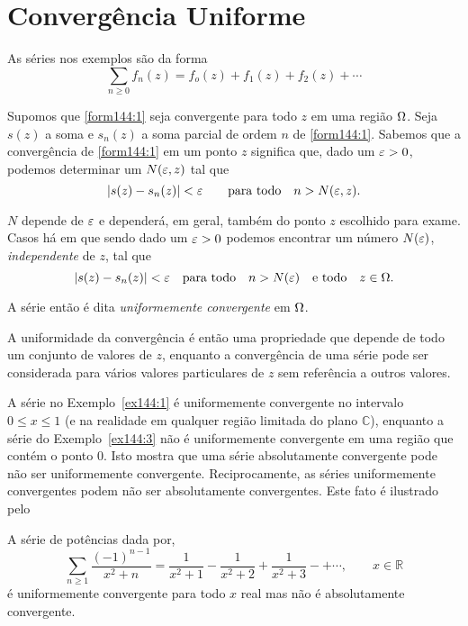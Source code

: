 \section*{Converg\^{e}ncia Uniforme} 
As s\'{e}ries nos exemplos s\~{a}o da
forma
\begin{equation}\label{form144:1}
\sum_{n\geq 0}f_n(z) = f_o(z) + f_1(z) + f_2(z)+\cdots
\end{equation}

Supomos que \eqref{form144:1} seja convergente para todo $z$ em
uma regi\~{a}o $\Omega$. Seja $s(z)$ a soma e $s_n(z)$ a soma parcial de
ordem $n$ de \eqref{form144:1}. Sabemos que a converg\^{e}ncia de
\eqref{form144:1} em um ponto $z$ significa que, dado um $\varepsilon >
0$, podemos determinar um $N(\varepsilon, z)$ tal que
\begin{equation*}
|s(z)-s_n(z)| < \varepsilon\qquad\text{para todo}\quad n > N(\varepsilon, z).
\end{equation*}

$N$ depende de $\varepsilon$ e depender\'{a}, em geral, tamb\'{e}m do ponto $z$
escolhido para exame. Casos h\'{a} em que sendo dado um $\varepsilon > 0$
podemos encontrar um n\'{u}mero $N(\varepsilon)$, \textit{independente} de
$z$, tal que
\begin{equation*}
| s(z) - s_n(z)| < \varepsilon\quad \text{para todo}\quad n >N(\varepsilon)\quad
\text{e todo}\quad z \in \Omega.
\end{equation*}

A s\'{e}rie ent\~{a}o \'{e} dita \textit{uniformemente convergente} em $\Omega$.

A uniformidade da converg\^{e}ncia \'{e} ent\~{a}o uma propriedade que depende
de todo um conjunto de valores de $z$, enquanto a converg\^{e}ncia de
uma s\'{e}rie pode ser considerada para v\'{a}rios valores particulares de
$z$ sem refer\^{e}ncia a outros valores.

A s\'{e}rie no Exemplo~\ref{ex144:1} \'{e} uniformemente convergente no
intervalo $0\le  x\le 1$ (e na realidade em qualquer regi\~{a}o
limitada do plano $\mathbb{C}$), enquanto a s\'{e}rie do
Exemplo~\ref{ex144:3} n\~{a}o \'{e} uniformemente convergente em uma
regi\~{a}o que cont\'{e}m o ponto $0$. Isto mostra que uma s\'{e}rie
absolutamente convergente pode n\~{a}o ser uniformemente convergente.
Reciprocamente, as s\'{e}ries uniformemente convergentes podem n\~{a}o ser
absolutamente convergentes. Este fato \'{e} ilustrado pelo

\begin{exer}\label{ex144:4} A s\'{e}rie de pot\^{e}ncias dada por,
\begin{equation*}
\sum_{n\geq 1}\frac{(-1)^{n-1}}{x^2+n}=
\frac{1}{x^2+1}-\frac{1}{x^2+2}+\frac{1}{x^2+3}-+\cdots,\qquad
x\in \mathbb{R}
\end{equation*}
\'{e} uniformemente convergente para todo $x$ real mas n\~{a}o \'{e}
absolutamente convergente.
\end{exer}

